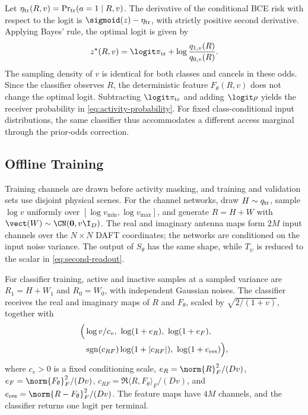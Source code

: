 Let $\eta_{\rm tr}(R,v)=\Pr_{\rm tr}(a=1\mid R,v)$.
The derivative of the conditional BCE risk with respect to the logit is
$\sigmoid(z)-\eta_{\rm tr}$, with strictly positive second derivative.
Applying Bayes' rule, the optimal logit is given by
\begin{equation}
 z^\star(R,v)=\logit\pi_{\rm tr}
 +\log\frac{q_{1,v}(R)}{q_{0,v}(R)}.
 \label{eq:ideal-logit}
\end{equation}
The sampling density of $v$ is identical for both classes and cancels
in these odds.
Since the classifier observes $R$, the deterministic feature
$F_\theta(R,v)$ does not change the optimal logit.
Subtracting $\logit\pi_{\rm tr}$ and adding $\logit\rho$ yields the receiver
probability in \eqref{eq:activity-probability}. For fixed class-conditional
input distributions, the same classifier thus accommodates a different
access marginal through the prior-odds correction.

\subsection{Offline Training}

Training channels are drawn before activity masking, and training and
validation sets use disjoint physical scenes.
For the channel networks, draw $H\sim q_{\rm tr}$, sample $\log v$
uniformly over $[\log v_{\min},\log v_{\max}]$, and generate
$R=H+W$ with $\vect(W)\sim\CN(\mathbf0,v\I_D)$.
The real and imaginary antenna maps form $2M$ input channels over
the $N\times N$ DAFT coordinates; the networks are conditioned on
the input noise variance. The output of $S_\theta$ has the same shape,
while $T_\psi$ is reduced to the scalar in \eqref{eq:second-readout}.

For classifier training, active and inactive samples at a sampled
variance are $R_1=H+W_1$ and $R_0=W_0$, with independent Gaussian
noises. The classifier receives the real and imaginary maps of
$R$ and $F_\theta$, scaled by $\sqrt{2/(1+v)}$, together with
\begin{equation}
 \begin{aligned}
 \Big(&\log v/c_v,\ \log(1+e_R),\ \log(1+e_F),\\
 &\operatorname{sgn}(c_{RF})\log(1+|c_{RF}|),\
 \log(1+e_{\rm res})\Big),
 \end{aligned}
 \label{eq:classifier-features}
\end{equation}
where $c_v>0$ is a fixed conditioning scale,
$e_R=\norm{R}_F^2/(Dv)$, $e_F=\norm{F_\theta}_F^2/(Dv)$,
$c_{RF}=\Re\langle R,F_\theta\rangle_F/(Dv)$, and
$e_{\rm res}=\norm{R-F_\theta}_F^2/(Dv)$.
The feature maps have $4M$ channels, and the classifier returns one
logit per terminal.

